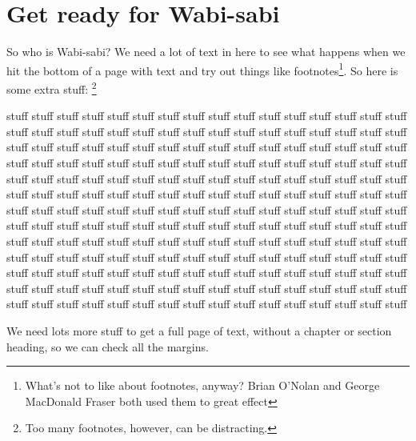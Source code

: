 \documentclass[dissertation, proposal]{bsu-cs}  %
\begin{document}
\section{Get ready for Wabi-sabi}\label{sec:getReady}

So who is Wabi-sabi? We need a lot of text in here to see what happens when we hit the bottom of
a page with text and try out things like footnotes\footnote{What's not to like about footnotes,
anyway?  Brian O'Nolan and George MacDonald Fraser both used them to great effect}.
So here is some extra stuff:%
\footnote{Too many footnotes, however, can be distracting.}

stuff stuff stuff stuff stuff stuff stuff stuff stuff stuff stuff stuff stuff
stuff stuff stuff stuff stuff stuff stuff stuff stuff stuff stuff stuff stuff
stuff stuff stuff stuff stuff stuff stuff stuff stuff stuff stuff stuff stuff
stuff stuff stuff stuff stuff stuff stuff stuff stuff stuff stuff stuff stuff
stuff stuff stuff stuff stuff stuff stuff stuff stuff stuff stuff stuff stuff
stuff stuff stuff stuff stuff stuff stuff stuff stuff stuff stuff stuff stuff
stuff stuff stuff stuff stuff stuff stuff stuff stuff stuff stuff stuff stuff
stuff stuff stuff stuff stuff stuff stuff stuff stuff stuff stuff stuff stuff
stuff stuff stuff stuff stuff stuff stuff stuff stuff stuff stuff stuff stuff
stuff stuff stuff stuff stuff stuff stuff stuff stuff stuff stuff stuff stuff
stuff stuff stuff stuff stuff stuff stuff stuff stuff stuff stuff stuff stuff
stuff stuff stuff stuff stuff stuff stuff stuff stuff stuff stuff stuff stuff
stuff stuff stuff stuff stuff stuff stuff stuff stuff stuff stuff stuff stuff
stuff stuff stuff stuff stuff stuff stuff stuff stuff stuff stuff stuff stuff
stuff stuff stuff stuff stuff stuff stuff stuff stuff stuff stuff stuff stuff
stuff stuff stuff stuff stuff stuff stuff stuff stuff stuff stuff stuff stuff

We need lots more stuff to get a full page of text, without a chapter or section heading,
so we can check all the margins.
\end{document}
